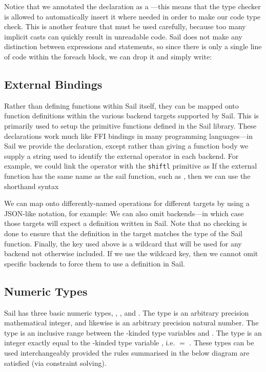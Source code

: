 Notice that we annotated the  declaration as a
---this means that the type checker is allowed to
automatically insert it where needed in order to make our code type
check. This is another feature that must be used carefully, because
too many implicit casts can quickly result in unreadable code. Sail
does not make any distinction between expressions and statements, so
since there is only a single line of code within the foreach block, we
can drop it and simply write: \mrbfnmyreplicatebitsthree

\subsection{External Bindings}

Rather than defining functions within Sail itself, they can be mapped
onto function definitions within the various backend targets supported
by Sail. This is primarily used to setup the primitive functions
defined in the Sail library. These declarations work much like FFI
bindings in many programming languages---in Sail we provide the
 declaration, except rather than giving a function body we
supply a string used to identify the external operator in each
backend. For example, we could link the \ll{>>} operator with the
\verb|shiftl| primitive as \mrbzeightoperatorzzerozIzIznine If the
external function has the same name as the sail function, such as
, then we can use the shorthand syntax
\mrbshiftl

We can map onto differently-named operations for different targets by
using a JSON-like  notation, for example:
\mrbzeightoperatorzzerozKzKznine We can also omit backends---in which
case those targets will expect a definition written in Sail. Note that
no checking is done to ensure that the definition in the target
matches the type of the Sail function. Finally, the \ll{_} key used
above is a wildcard that will be used for any backend not otherwise
included. If we use the wildcard key, then we cannot omit specific
backends to force them to use a definition in Sail.

\subsection{Numeric Types}
\label{sec:numeric}

Sail has three basic numeric types, , , and
. The type  is an arbitrary precision mathematical
integer, and likewise  is an arbitrary precision natural
number. The type  is an inclusive range between the
-kinded type variables  and . The type
 is an integer exactly equal to the -kinded type
variable , i.e.  $=$ . These types
can be used interchangeably provided the rules summarised in the below
diagram are satisfied (via constraint solving).


